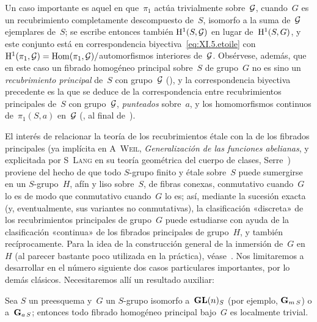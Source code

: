 \label{page-300}
Un caso importante es aquel en que~$\pi_1$ actúa trivialmente sobre~$\cal{G}$,
\ie cuando~$G$ es un recubrimiento completamente descompuesto de~$S$,
isomorfo a la suma de~$\cal{G}$ ejemplares de~$S$; se escribe entonces también
$\H^1(S,\cal{G})$ en lugar de~$\H^1(S,G)$, y este conjunto está en
correspondencia biyectiva~\eqref{eq:XI.5.etoile} con
$\H^1(\pi_1,\cal G)= \Hom(\pi_1,\cal{G})/$automorfismos interiores
de~$\cal{G}$. Obsérvese, además, que en este caso un fibrado homogéneo
principal sobre~$S$ de grupo~$G$ no es sino un \emph{recubrimiento principal}
de~$S$ con grupo~$\cal{G}$ (), y la correspondencia biyectiva
precedente es la que se deduce de la correspondencia entre recubrimientos
principales de~$S$ con grupo~$\cal{G}$, \emph{punteados} sobre~$a$, y los
homomorfismos continuos de~$\pi_1(S,a)$ en~$\cal{G}$
(, al final de~).

El interés de relacionar la teoría de los recubrimientos étale con la de los
fibrados principales (ya implícita en \textsc{A\ptbl\ Weil},
\emph{Generalización de las funciones abelianas}, y explicitada por
\textsc{S\ptbl\ Lang} en su teoría geométrica del cuerpo de clases, \cf
Serre~\cite{XI.5}) proviene del hecho de que todo $S$-grupo finito y étale
sobre~$S$ puede sumergirse en un $S$-grupo~$H$, afín y liso sobre~$S$, de
fibras conexas,
{conmutativo cuando~$G$ lo es de modo que}
{conmutativo cuando~$G$ lo es; así,}
mediante la sucesión
exacta~ (y, eventualmente, sus variantes no conmutativas), la
clasificación «discreta» de los recubrimientos principales de grupo~$G$ puede
estudiarse con ayuda de la clasificación «continua» de los fibrados
principales de grupo~$H$, y también recíprocamente. Para la idea de la
construcción general de la inmersión de~$G$ en~$H$ (al parecer bastante poco
utilizada en la práctica), véase~\cite[VI~2.8]{XI.5}. Nos limitaremos a
desarrollar en el número siguiente dos casos particulares importantes, por
lo demás clásicos. Necesitaremos allí un resultado auxiliar:

\begin{proposition}
\label{XI.5.1}
Sea
$S$ un preesquema y~$G$ un $S$-grupo isomorfo a~$\Gl(n)_S$ (por ejemplo,
$\GG_{m\,S}$) o a~$\GG_{a\,S}$; entonces todo fibrado homogéneo principal
bajo~$G$ es localmente trivial.
\end{proposition}

